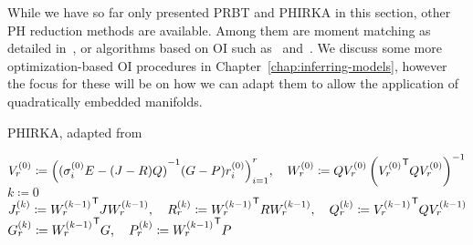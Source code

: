 \begin{remark}
    While we have so far only presented \ac{PRBT} and \ac{PHIRKA} in this section, other \ac{PH} reduction methods are available.
    Among them are moment matching as detailed in~\cite{Polyuga2010}, or algorithms based on \ac{OI} such as~\cite{BGD2020} and~\cite{Lee2022}.
    We discuss some more optimization-based \ac{OI} procedures in Chapter~\ref{chap:inferring-models}, however the focus for these will be on how we can adapt them to allow the application of quadratically embedded manifolds.
\end{remark}

\begin{algorithm}\label{alg:ph-irka}
    \caption{\ac{PHIRKA}, adapted from~\cite[Algorithm~1]{Gugercin2012}}
    $V_r^{(0)} \coloneqq {\left( {(\sigma_i^{(0)} E - (J - R) Q)}^{-1} (G - P) r_i^{(0)} \right)}_{i = 1}^r,\quad W_r^{(0)} \coloneqq Q V_r^{(0)} \left( {V_r^{(0)}}^{\mkern1mu \mathsf{T}} Q V_r^{(0)} \right)^{-1}$\;
    $k \coloneqq 0$\;
    $J_r^{(k)} \coloneqq {W_r^{(k - 1)}}^{\mkern1mu \mathsf{T}} J W_r^{(k - 1)},\quad R_r^{(k)} \coloneqq {W_r^{(k - 1)}}^{\mkern1mu \mathsf{T}} R W_r^{(k - 1)},\quad Q_r^{(k)} \coloneqq {V_r^{(k - 1)}}^{\mkern1mu \mathsf{T}} Q V_r^{(k - 1)}$\;
    $G_r^{(k)} \coloneqq {W_r^{(k - 1)}}^{\mkern1mu \mathsf{T}} G,\quad P_r^{(k)} \coloneqq {W_r^{(k - 1)}}^{\mkern1mu \mathsf{T}} P$\;
\end{algorithm}


